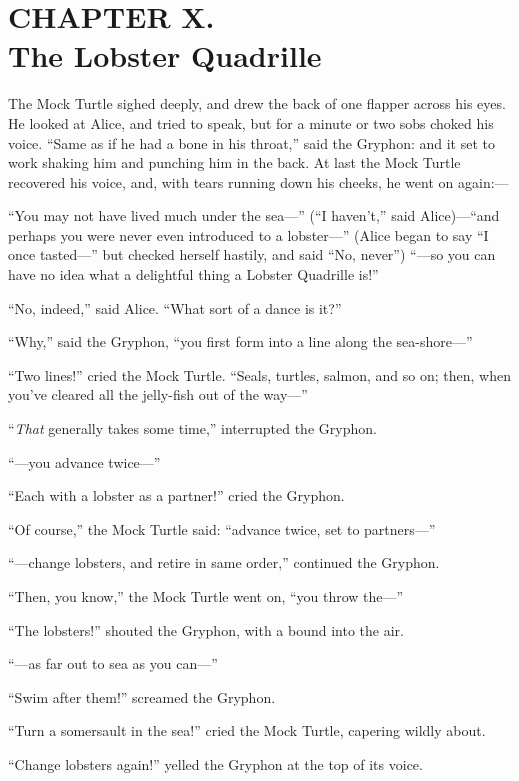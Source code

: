 \documentclass[11pt,openany,oneside]{book}
\begin{document}
\chapter*{CHAPTER X.\\  The Lobster Quadrille}
\leavevmode\hypertarget{d13.fp155277}{}The Mock Turtle sighed deeply, and drew the back of one flapper across his eyes. He looked at Alice, and tried to speak, but for a minute or two sobs choked his voice. “Same as if he had a bone in his throat,” said the Gryphon: and it set to work shaking him and punching him in the back. At last the Mock Turtle recovered his voice, and, with tears running down his cheeks, he went on again:— 

“You may not have lived much under the sea—” (“I haven’t,” said Alice)—“and perhaps you were never even introduced to a lobster—” (Alice began to say “I once tasted—” but checked herself hastily, and said “No, never”) “—so you can have no idea what a delightful thing a Lobster Quadrille is!” 

“No, indeed,” said Alice. “What sort of a dance is it?” 

“Why,” said the Gryphon, “you first form into a line along the sea-shore—” 

“Two lines!” cried the Mock Turtle. “Seals, turtles, salmon, and so on; then, when you’ve cleared all the jelly-fish out of the way—” 

“{\em That\/} generally takes some time,” interrupted the Gryphon. 

“—you advance twice—” 

“Each with a lobster as a partner!” cried the Gryphon. 

“Of course,” the Mock Turtle said: “advance twice, set to partners—” 

“—change lobsters, and retire in same order,” continued the Gryphon. 

“Then, you know,” the Mock Turtle went on, “you throw the—” 

“The lobsters!” shouted the Gryphon, with a bound into the air. 

“—as far out to sea as you can—” 

“Swim after them!” screamed the Gryphon. 

“Turn a somersault in the sea!” cried the Mock Turtle, capering wildly about. 

“Change lobsters again!” yelled the Gryphon at the top of its voice. 
\end{document}
